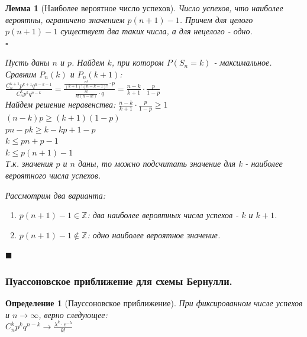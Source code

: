 \documentclass[14pt]{extarticle}
\theoremstyle{breakstyle}
\newtheorem{definition}{Определение}[subsection]
\newtheorem{lemma}{Лемма}[subsection]
\begin{document}
\begin{lemma}[Наиболее вероятное число успехов]

Число успехов, что наиболее вероятны, ограничено значением $p(n+1) - 1$. Причем для целого $p(n+1) - 1$ существует два таких числа, а для нецелого - одно. \\

$\square$

Пусть даны $n$ и $p$. Найдем $k$, при котором $P(S_{n} = k)$ - максимальное. \\
Сравним $P_{n}(k)$ и $P_{n}(k+1)$: \\

$\frac{C_{n}^{k+1}p^{k+1}q^{n-k-1}}{C_{n}^{k}p^{k}q^{n-k}} = \frac{\frac{n!}{(k+1)!(n-k-1)!} \cdot p}{\frac{n!}{k!(n-k!)} \cdot q} = \frac{n-k}{k+1} \cdot \frac{p}{1-p}$ \\
Найдем решение неравенства: $\frac{n-k}{k+1} \cdot \frac{p}{1-p} \geq 1$ \\
$(n-k)p \geq (k+1)(1-p)$ \\
$pn - pk \geq k - kp + 1 - p$ \\
$k \leq pn + p - 1$ \\
$k \leq p(n+1) - 1$ \\

Т.к. значения $p$ и $n$ даны, то можно подсчитать значение для k - наиболее вероятного числа успехов.

Рассмотрим два варианта:
\begin{enumerate}
    \item $p(n+1) - 1 \in \mathbb{Z}$: два наиболее вероятных числа успехов - $k$ и $k+1$.
    \item $p(n+1) - 1 \notin \mathbb{Z}$: одно наиболее вероятное значение.
\end{enumerate}

\hfill$\blacksquare$

\end{lemma}

\subsubsection{Пуассоновское приближение для схемы Бернулли.}
\begin{definition}[Пауссоновское приближение]
При фиксированном числе успехов и $n \rightarrow \infty$, верно следующее: \\
$C_{n}^{k}p^{k}q^{n-k} \rightarrow \frac{\lambda^{k} \cdot e^{-\lambda}}{k!}$

\end{definition}
\end{document}
